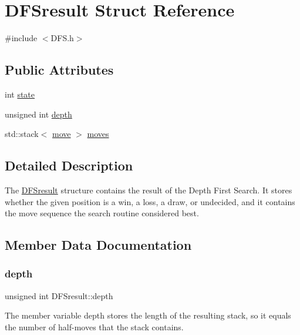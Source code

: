 \hypertarget{structDFSresult}{}\section{D\+F\+Sresult Struct Reference}
\label{structDFSresult}


{\ttfamily \#include $<$D\+F\+S.\+h$>$}

\subsection*{Public Attributes}
\begin{DoxyCompactItemize}
\item 
int \hyperlink{structDFSresult_a05517437c3e1db1f5b212f2862801b85}{state}
\item 
unsigned int \hyperlink{structDFSresult_a0d91b41c51df56f42e450f9ce82fa4f2}{depth}
\item 
std\+::stack$<$ \hyperlink{structmove}{move} $>$ \hyperlink{structDFSresult_acbab901f87df79e0ff718f4fd9435a0f}{moves}
\end{DoxyCompactItemize}


\subsection{Detailed Description}
The \hyperlink{structDFSresult}{D\+F\+Sresult} structure contains the result of the Depth First Search. It stores whether the given position is a win, a loss, a draw, or undecided, and it contains the move sequence the search routine considered best. 

\subsection{Member Data Documentation}
\mbox{\label{structDFSresult_a0d91b41c51df56f42e450f9ce82fa4f2}} 
\subsubsection{\texorpdfstring{depth}{depth}}
{\footnotesize\ttfamily unsigned int D\+F\+Sresult\+::depth}

The member variable depth stores the length of the resulting stack, so it equals the number of half-\/moves that the stack contains. \mbox{\label{structDFSresult_acbab901f87df79e0ff718f4fd9435a0f}} 
